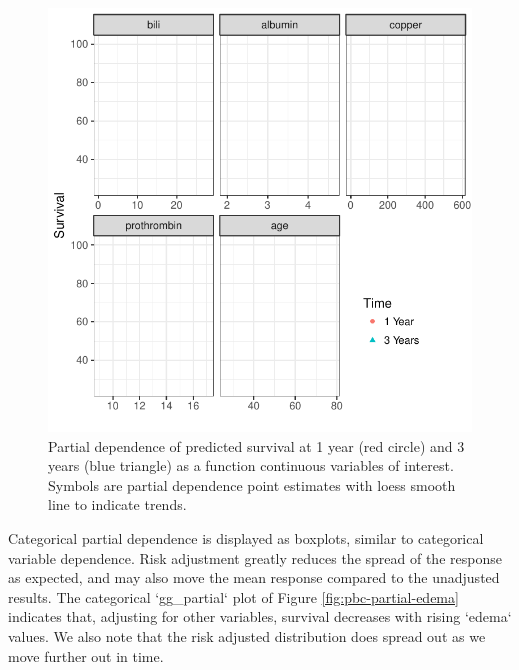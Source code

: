\documentclass[article]{jss}
\begin{document}
\begin{Schunk}
\begin{figure}[!htb]

{\centering \includegraphics{fig-rfs/rfs-pbc-partial-panel-1} 

}

\caption[Partial dependence of predicted survival at 1 year (red circle) and 3 years (blue triangle) as a function continuous variables of interest]{Partial dependence of predicted survival at 1 year (red circle) and 3 years (blue triangle) as a function continuous variables of interest. Symbols are partial dependence point estimates with loess smooth line to indicate trends.}\label{fig:pbc-partial-panel}
\end{figure}
\end{Schunk}

Categorical partial dependence is displayed as boxplots, similar to categorical variable dependence. Risk adjustment greatly reduces the spread of the response as expected, and may also move the mean response compared to the unadjusted results. The categorical `gg_partial` plot of Figure \ref{fig:pbc-partial-edema} indicates that, adjusting for other variables, survival decreases with rising `edema` values. We also note that the risk adjusted distribution does spread out as we move further out in time.
\end{document}
